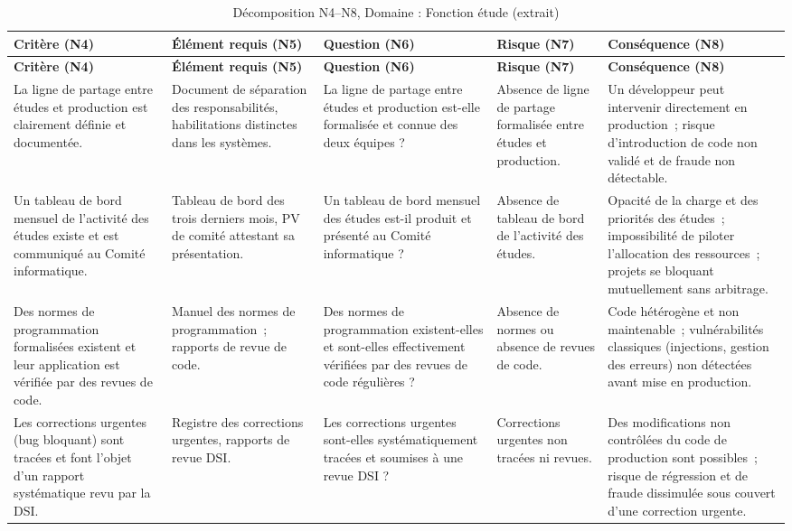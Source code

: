 \small
\begin{longtable}{p{2.8cm}p{2.7cm}p{2.7cm}p{2.4cm}p{2.6cm}}
\caption{Décomposition N4--N8, Domaine : Fonction étude (extrait)} \\
\toprule
\textbf{Critère (N4)} & \textbf{Élément requis (N5)} & \textbf{Question (N6)} & \textbf{Risque (N7)} & \textbf{Conséquence (N8)} \\
\midrule
\endfirsthead
\toprule
\textbf{Critère (N4)} & \textbf{Élément requis (N5)} & \textbf{Question (N6)} & \textbf{Risque (N7)} & \textbf{Conséquence (N8)} \\
\midrule
\endhead
\bottomrule
\endlastfoot

La ligne de partage entre études et production est clairement définie et documentée. &
Document de séparation des responsabilités, habilitations distinctes dans les systèmes. &
La ligne de partage entre études et production est-elle formalisée et connue des deux équipes ? &
Absence de ligne de partage formalisée entre études et production. &
Un développeur peut intervenir directement en production~; risque d'introduction de code non validé et de fraude non détectable. \\
\addlinespace

Un tableau de bord mensuel de l'activité des études existe et est communiqué au Comité informatique. &
Tableau de bord des trois derniers mois, PV de comité attestant sa présentation. &
Un tableau de bord mensuel des études est-il produit et présenté au Comité informatique ? &
Absence de tableau de bord de l'activité des études. &
Opacité de la charge et des priorités des études~; impossibilité de piloter l'allocation des ressources~; projets se bloquant mutuellement sans arbitrage. \\
\addlinespace

Des normes de programmation formalisées existent et leur application est vérifiée par des revues de code. &
Manuel des normes de programmation~; rapports de revue de code. &
Des normes de programmation existent-elles et sont-elles effectivement vérifiées par des revues de code régulières ? &
Absence de normes ou absence de revues de code. &
Code hétérogène et non maintenable~; vulnérabilités classiques (injections, gestion des erreurs) non détectées avant mise en production. \\
\addlinespace

Les corrections urgentes (bug bloquant) sont tracées et font l'objet d'un rapport systématique revu par la DSI. &
Registre des corrections urgentes, rapports de revue DSI. &
Les corrections urgentes sont-elles systématiquement tracées et soumises à une revue DSI ? &
Corrections urgentes non tracées ni revues. &
Des modifications non contrôlées du code de production sont possibles~; risque de régression et de fraude dissimulée sous couvert d'une correction urgente. \\

\end{longtable}

